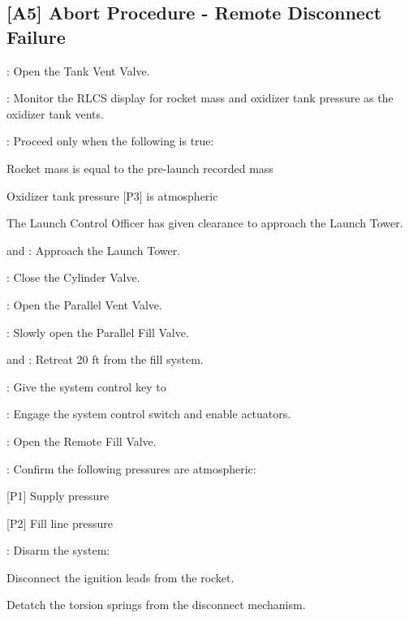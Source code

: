 \begin{checklist}
\subsection{[A5] Abort Procedure - Remote Disconnect Failure}
\begin{checklist}
    \item \control{}: Open the Tank Vent Valve.
    \item \control{}: Monitor the RLCS display for rocket mass and oxidizer tank pressure as the oxidizer tank vents.
    \item \ops{}: Proceed only when the following is true:
    \begin{checklist}
        \item Rocket mass is equal to the pre-launch recorded mass
        \item Oxidizer tank pressure [P3] is atmospheric
        \item The Launch Control Officer has given clearance to approach the Launch Tower.
    \end{checklist}
    \item \primary{} and \secondary: Approach the Launch Tower.
    \item \primary{}: Close the Cylinder Valve.
    \item \primary{}: Open the Parallel Vent Valve.
    \item \primary{}: Slowly open the Parallel Fill Valve.
    \item \primary{} and \secondary: Retreat 20 ft from the fill system.
    \item \ops: Give the system control key to \control{}
    \item \control{}: Engage the system control switch and enable actuators.
    \item \control{}: Open the Remote Fill Valve.
    \item \control{}: Confirm the following pressures are atmospheric:
    \begin{checklist}
        \item {[P1]} Supply pressure
        \item {[P2]} Fill line pressure
    \end{checklist}
    \item \primary{}: Disarm the system:
        \begin{checklist}    
            \item Disconnect the ignition leads from the rocket.
            \item Detatch the torsion springs from the disconnect mechanism.

\end{checklist}
\end{checklist}
\end{checklist}
